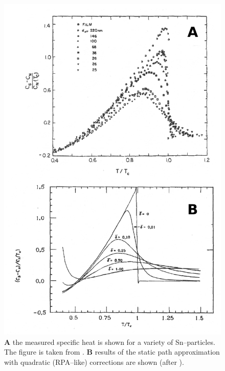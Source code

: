 \begin{subappendices}
\begin{figure}
 \centerline{\includegraphics*[width=12cm,angle=0]{nutshell/figs/fig2E2.pdf}}
 \caption{ \textbf{A} the measured specific heat is shown for a variety of Sn--particles. The figure is taken from \cite{Tsuboi:77}. \textbf{B}  results of the static path approximation with quadratic (RPA--like) corrections  are shown (after \cite{Lauritzen:93}).}\label{fig2.E.2}
 \end{figure}










\end{subappendices}









\newpage
\renewcommand{\bibname}{Bibliography Ch 3}
 
% 
 


